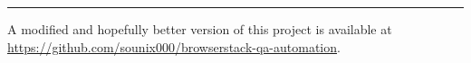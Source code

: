 \documentclass{article}
\begin{document}
\hrule
\begin{tcolorbox}[colback=gray!5, colframe=blue!50, title=\textbf{Note}]
A modified and hopefully better version of this project is available at \url{https://github.com/sounix000/browserstack-qa-automation}.
\end{tcolorbox}
\end{document}
